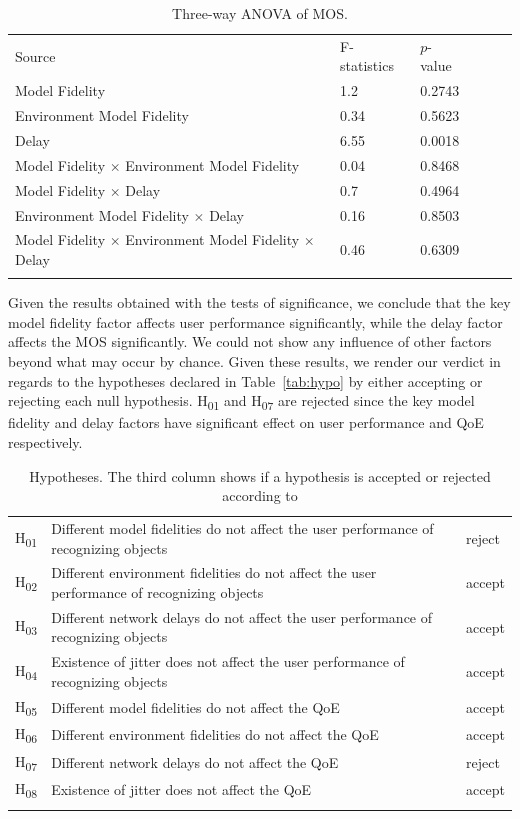 \begin{table}[!htbp]
\caption{Three-way ANOVA of MOS.}
\label{tab:tam}
\begin{tabular}{llllll}
\hline\noalign{\smallskip}
Source & F-statistics & $p$-value \\
\noalign{\smallskip}\hline\noalign{\smallskip}
Model Fidelity & 1.2 & 0.2743 \\
Environment Model Fidelity & 0.34 & 0.5623 \\
Delay & 6.55 & 0.0018 \\
Model Fidelity $\times$ Environment Model Fidelity & 0.04 & 0.8468 \\
Model Fidelity $\times$ Delay & 0.7 & 0.4964 \\
Environment Model Fidelity $\times$ Delay & 0.16 & 0.8503 \\
Model Fidelity $\times$ Environment Model Fidelity $\times$ Delay & 0.46 & 0.6309 \\
\noalign{\smallskip}\hline
\end{tabular}
\end{table}

Given the results obtained with the tests of significance, we conclude that the key model fidelity factor affects user performance significantly, while the delay factor affects the MOS significantly. We could not show any influence of other factors beyond what may occur by chance. Given these results, we render our verdict in regards to the hypotheses declared in Table~\ref{tab:hypo} by either accepting or rejecting each null hypothesis.
H\textsubscript{01} and H\textsubscript{07} are rejected since the key model fidelity and delay factors have significant effect on user performance and QoE respectively.

\begin{table}[!htbp]
\caption{Hypotheses. The third column shows if a hypothesis is accepted or rejected according to }
\label{tab:results}
\begin{tabular}{lll}
\hline\noalign{\smallskip}
H\textsubscript{01} & Different model fidelities do not affect the user performance of recognizing objects & reject \\
H\textsubscript{02} & Different environment fidelities do not affect the user performance of recognizing objects & accept \\
H\textsubscript{03} & Different network delays do not affect the user performance of recognizing objects & accept \\
H\textsubscript{04} & Existence of jitter does not affect the user performance of recognizing objects & accept \\
H\textsubscript{05} & Different model fidelities do not affect the QoE & accept \\
H\textsubscript{06} & Different environment fidelities do not affect the QoE & accept \\
H\textsubscript{07} & Different network delays do not affect the QoE & reject \\
H\textsubscript{08} & Existence of jitter does not affect the QoE & accept \\
\noalign{\smallskip}\hline
\end{tabular}
\end{table}

